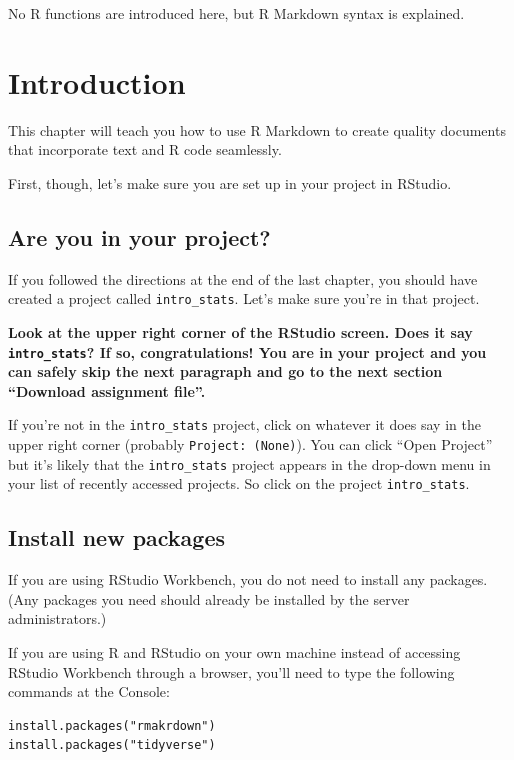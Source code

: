\documentclass[
]{book}
\begin{document}
No R functions are introduced here, but R Markdown syntax is explained.

\hypertarget{rmark-intro}{%
\section{Introduction}\label{rmark-intro}}

This chapter will teach you how to use R Markdown to create quality documents that incorporate text and R code seamlessly.

First, though, let's make sure you are set up in your project in RStudio.

\hypertarget{rmark-project}{%
\subsection{Are you in your project?}\label{rmark-project}}

If you followed the directions at the end of the last chapter, you should have created a project called \texttt{intro\_stats}. Let's make sure you're in that project.

\textbf{Look at the upper right corner of the RStudio screen. Does it say \texttt{intro\_stats}? If so, congratulations! You are in your project and you can safely skip the next paragraph and go to the next section ``Download assignment file''.}

If you're not in the \texttt{intro\_stats} project, click on whatever it does say in the upper right corner (probably \texttt{Project:\ (None)}). You can click ``Open Project'' but it's likely that the \texttt{intro\_stats} project appears in the drop-down menu in your list of recently accessed projects. So click on the project \texttt{intro\_stats}.

\hypertarget{rmark-install}{%
\subsection{Install new packages}\label{rmark-install}}

If you are using RStudio Workbench, you do not need to install any packages. (Any packages you need should already be installed by the server administrators.)

If you are using R and RStudio on your own machine instead of accessing RStudio Workbench through a browser, you'll need to type the following commands at the Console:

\begin{verbatim}
install.packages("rmakrdown")
install.packages("tidyverse")
\end{verbatim}
\end{document}
